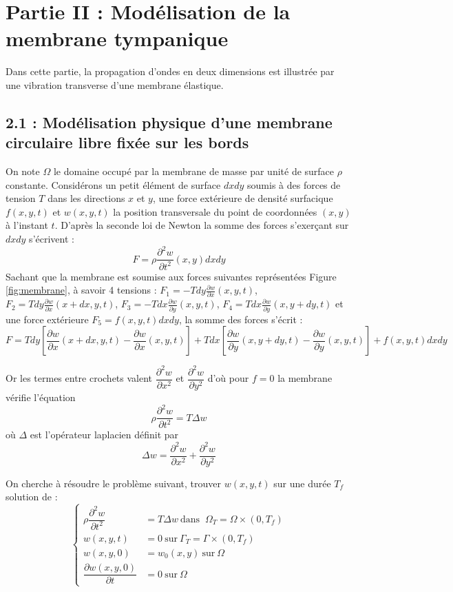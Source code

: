 \documentclass[a4,12pt]{article}
\begin{document}
\section*{Partie II : Modélisation de la membrane tympanique}

Dans cette partie, la propagation d'ondes en deux dimensions est illustrée par une vibration transverse d'une membrane élastique.

\subsection*{2.1 : Modélisation physique d'une membrane circulaire libre fixée sur les bords}

On note $\Omega$ le domaine occupé par la membrane de masse par unité de surface $\rho$ constante. Considérons un petit élément de surface $dxdy$ soumis à des forces de tension $T$  dans les directions $x$ et $y$, une force extérieure de densité surfacique $f(x,y,t)$ et $w(x,y,t)$ la position transversale du point de coordonnées $(x,y)$ à l'instant $t$. D'après la seconde loi de Newton la somme des forces s'exerçant sur $dxdy$ s'écrivent : 
\[
  F=\rho  \frac{\partial^2 w}{\partial t^2}(x,y)dxdy
\]
Sachant que la membrane est soumise aux forces suivantes représentées Figure \ref{fig:membrane}, à savoir 4 tensions : $F_1=-Tdy\frac{\partial w}{\partial x}(x,y,t)$, $F_2=Tdy\frac{\partial w}{\partial x}(x+dx,y,t)$, $F_3=-Tdx\frac{\partial w}{\partial y}(x,y,t)$, $F_4=Tdx\frac{\partial w}{\partial y}(x,y+dy,t)$ et une force extérieure $F_5=f(x,y,t)dxdy$, la somme des forces s'écrit : 
\[
  F=Tdy\left[\frac{\partial w}{\partial x}(x+dx,y,t)-\frac{\partial w}{\partial x}(x,y,t)\right]+Tdx\left[\frac{\partial w}{\partial y}(x,y+dy,t)-\frac{\partial w}{\partial y}(x,y,t)\right]+f(x,y,t)dxdy
\]

Or les termes entre crochets valent $\dfrac{\partial^2 w}{\partial x^2}$ et $\dfrac{\partial^2 w}{\partial y^2}$ d'où pour $f=0$ la membrane vérifie l'équation 
\[
  \rho \dfrac{\partial^2 w}{\partial t^2}=T \Delta w
\]
où $\Delta$ est l'opérateur laplacien définit par 
\[
  \Delta w=\dfrac{\partial^2 w}{\partial x^2}+\dfrac{\partial^2 w}{\partial y^2}
\]


On cherche à résoudre le problème suivant, trouver $w(x,y,t)$ sur une durée $T_f$ solution de :
\begin{equation}
  \left\{
    \begin{array}{rl}
      \rho \dfrac{\partial^2 w}{\partial t^2} & =  T \Delta w ~\textrm{dans } ~ \Omega_T = \Omega \times (0,T_f)\\ 
      w(x,y,t)& =  0 ~\textrm{sur} ~ \Gamma_T=\Gamma \times (0,T_f)\\
      w(x,y,0)& = w_0(x,y) ~ \textrm{sur} ~\Omega \\
      \dfrac{\partial w(x,y,0)}{\partial t} & = 0 ~\textrm{sur} ~\Omega 
    \end{array}
    \right.
    \label{eq:membranemodel}
  \end{equation}
\end{document}
